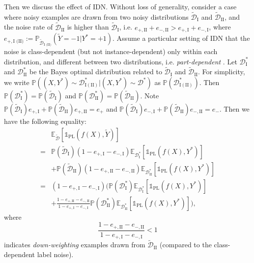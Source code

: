 \documentclass[final]{cvpr}
\newcommand{\PP}{\mathbb P}
\newcommand{\BR}{\mathds 1}
\newcommand{\E}{\mathbb E}
\newcommand{\rev}[1]{{\color{blue}#1}}
\newcommand{\rev}[1]{#1}
\begin{document}
Then we discuss the effect of IDN.
Without loss of generality, consider a case where noisy examples are drawn from two noisy distributions $\widetilde {\mathcal D}_{\text{I}}$ and $\widetilde {\mathcal D}_{\text{II}}$, and the noise rate of $\widetilde {\mathcal D}_{\text{II}}$ is higher than $\widetilde {\mathcal D}_{\text{I}}$, i.e. $e_{+,\text{II}}+e_{-,\text{II}} > e_{+,\text{I}}+e_{-,\text{I}}$, where $e_{+,\text{I (II)}} := \PP_{\widetilde {\mathcal D}_{\text{I (II)}}}(\widetilde Y=-1|Y^* = +1)$. \rev{Assume a particular setting of IDN that the noise is class-dependent (but not instance-dependent) only within each distribution, and different between two distributions, i.e. \textit{part-dependent} \cite{xia2020parts}.}
Let ${\mathcal D}_{\text{I}}^*$ and ${\mathcal D}_{\text{II}}^*$ be the Bayes optimal distribution related to $\widetilde{\mathcal D}_{\text{I}}$ and $\widetilde{\mathcal D}_{\text{II}}$. 
For simplicity, we write $\PP((X,Y^*)\sim{\mathcal D}^*_{\text{I} (\text{II})}|(X,Y^*)\sim{\mathcal D}^*)$ as $\PP({\mathcal D}_{\text{I} (\text{II})}^*)$.
Then $\PP({\mathcal D}_{\text{I}}^*) = \PP(\widetilde{\mathcal D}_{\text{I}})$ and $\PP({\mathcal D}_{\text{II}}^*) = \PP(\widetilde{\mathcal D}_{\text{II}})$.
Note $\PP(\widetilde{\mathcal D}_{\text{I}}) e_{+,\text{I}} + \PP(\widetilde{\mathcal D}_{\text{II}}) e_{+,\text{II}} = e_{+}$ and $\PP(\widetilde{\mathcal D}_{\text{I}}) e_{-,\text{I}} + \PP(\widetilde{\mathcal D}_{\text{II}}) e_{-,\text{II}} = e_{-}.$ Then we have the following equality:
{
\begin{align*}
  & \E_{\widetilde{\mathcal D}}[{\BR_{\text{PL}}}(f(X),\widetilde{Y})] \\
= & \PP(\widetilde{\mathcal D}_{\text{I}})(1-e_{+,\text{I}}-e_{-,\text{I}})\E_{{\mathcal D}_{\text{I}}^*}[ {\BR_{\text{PL}}}(f(X),Y^*)]  \\  
  & + \PP(\widetilde{\mathcal D}_{\text{II}})(1-e_{+,\text{II}}-e_{-,\text{II}})\E_{\mathcal D_{\text{II}}^*}[ {\BR_{\text{PL}}}(f(X),Y^*)] \\
= & (1-e_{+,\text{I}}-e_{-,\text{I}}) \bigg( \PP(\mathcal D^*_{\text{I}})\E_{\mathcal D_{\text{I}}^*}[ {\BR_{\text{PL}}}(f(X),Y^*)]  \\
& + \frac{1-e_{+,\text{II}}-e_{-,\text{II}}}{1-e_{+,\text{I}}-e_{-,\text{I}}}\PP(\mathcal D^*_{\text{II}})\E_{\mathcal D_{\text{II}}^*}[ {\BR_{\text{PL}}}(f(X),Y^*)] \bigg),
\end{align*}}
where \[\frac{1-e_{+,\text{II}}-e_{-,\text{II}}}{1-e_{+,\text{I}}-e_{-,\text{I}}} < 1\] indicates \emph{down-weighting} examples drawn from $\widetilde {\mathcal D}_{\text{II}}$ (compared to the class-dependent label noise).
\end{document}
